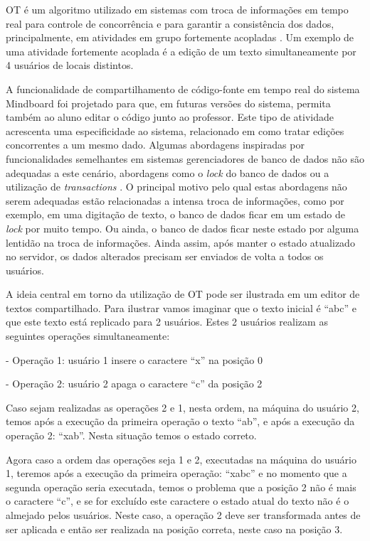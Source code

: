 OT é um algoritmo utilizado em sistemas com troca de informações em tempo real para controle de concorrência e para garantir a consistência dos dados, principalmente, em atividades em grupo fortemente acopladas \cite{ot}. Um exemplo de uma atividade fortemente acoplada é a edição de um texto simultaneamente por 4 usuários de locais distintos.

A funcionalidade de compartilhamento de código-fonte em tempo real do sistema Mindboard foi projetado para que, em futuras versões do sistema, permita também ao aluno editar o código junto ao professor. Este tipo de atividade acrescenta uma especificidade ao sistema, relacionado em como tratar edições concorrentes a um mesmo dado. Algumas abordagens inspiradas por funcionalidades semelhantes em sistemas gerenciadores de banco de dados não são adequadas a este cenário, abordagens como o \emph{lock} do banco de dados ou a utilização de \emph{transactions} \cite{ot}. O principal motivo pelo qual estas abordagens não serem adequadas estão relacionadas a intensa troca de informações, como por exemplo, em uma digitação de texto, o banco de dados ficar em um estado de \emph{lock} por muito tempo. Ou ainda, o banco de dados ficar neste estado por alguma lentidão na troca de informações. Ainda assim, após manter o estado atualizado no servidor, os dados alterados precisam ser enviados de volta a todos os usuários. 

A ideia central em torno da utilização de OT pode ser ilustrada em um editor de textos compartilhado. Para ilustrar vamos imaginar que o texto inicial é ``abc'' e que este texto está replicado para 2 usuários. Estes 2 usuários realizam as seguintes operações simultaneamente:

- Operação 1: usuário 1 insere o caractere ``x'' na posição 0

- Operação 2: usuário 2 apaga o caractere ``c'' da posição 2

Caso sejam realizadas as operações 2 e 1, nesta ordem, na máquina do usuário 2, temos após a execução da primeira operação o texto ``ab'', e após a execução da operação 2: ``xab''. Nesta situação temos o estado correto.

Agora caso a ordem das operações seja 1 e 2, executadas na máquina do usuário 1, teremos após a execução da primeira operação: ``xabc'' e no momento que a segunda operação seria executada, temos o problema que a posição 2 não é mais o caractere ``c'', e se for excluído este caractere o estado atual do texto não é o almejado pelos usuários. Neste caso, a operação 2 deve ser transformada antes de ser aplicada e então ser realizada na posição correta, neste caso na posição 3. 

